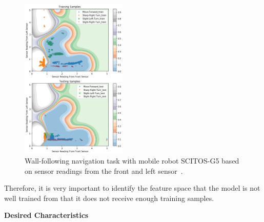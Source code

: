 \begin{figure}[t]
\centering
\includegraphics[width=0.45\textwidth]{FIG/toy1.png}
\caption{Wall-following navigation task with mobile robot SCITOS-G5 based on sensor readings from the front and left sensor~\cite{Dua:2017}.}
\label{fig:toy1}
\end{figure}


Therefore, it is very important to identify the feature space that the model is not well trained from that it does not receive enough training samples.


\noindent\textbf{Desired Characteristics}